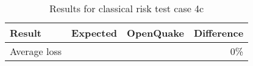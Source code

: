 \begin{table}[htbp]

\centering
\begin{tabular}{ l r r r }

\hline
\rowcolor{anti-flashwhite}
\bf{Result} & \bf{Expected} & \bf{OpenQuake} & \bf{Difference}\\
\hline
Average loss &  &  & 0\% \\
\hline
\end{tabular}

\caption{Results for classical risk test case 4c}
\label{tab:result-classical-risk-4c}
\end{table}